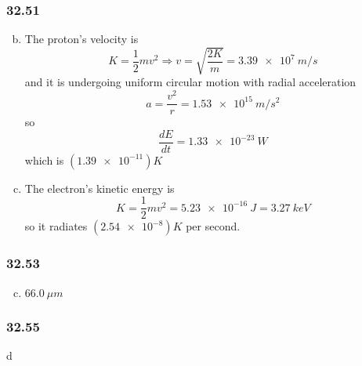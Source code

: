 \documentclass{article}
\begin{document}
\subsubsection{32.51}

\begin{enumerate}[(a)]
  \setcounter{enumi}{1}
  \item The proton's velocity is \[K = \frac{1}{2} m v^2 \Rightarrow v = \sqrt{\frac{2 K}{m}} = \qty{3.39e7}{m/s}\] and it is undergoing uniform circular motion with radial acceleration \[a = \frac{v^2}{r} = \qty{1.53e15}{m/s^2}\] so \[\frac{dE}{dt} = \qty{1.33e-23}{W}\] which is $(\num{1.39e-11}) K$

  \item The electron's kinetic energy is \[K = \frac{1}{2} m v^2 = \qty{5.23e-16}{J} = \qty{3.27}{keV}\] so it radiates $(\num{2.54e-8}) K$ per second.
\end{enumerate}

\subsubsection{32.53}

\begin{enumerate}[(a)]
  \setcounter{enumi}{2}
  \item $\qty{66.0}{\mu m}$
\end{enumerate}

\subsubsection{32.55}

d
\end{document}
